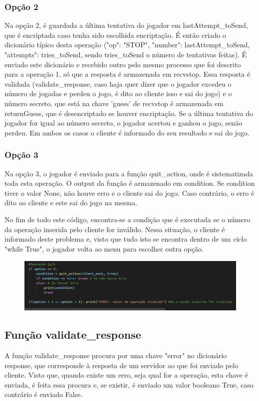 \documentclass{report}
\begin{document}
\subsubsection{Opção 2}
\label{sssec:second}

Na opção 2, é guardada a última tentativa do jogador em lastAttempt\_toSend, que é encriptada caso tenha sido escolhida encriptação.
É então criado o dicionário típico desta operação ({"op": "STOP", "number": lastAttempt\_toSend, "attempts": tries\_toSend}, sendo
tries\_toSend o número de tentativas feitas). É enviado este dicionário e recebido outro pelo mesmo processo que foi descrito para
a operação 1, só que a resposta é armazenada em recvstop. Essa resposta é validada (validate\_response, caso haja quer dizer que
o jogador excedeu o número de jogadas e perdeu o jogo, é dito ao cliente isso e sai do jogo)
e o número secreto, que está na chave 'guess' de recvstop é armazenada em returnGuess, que é desencriptado se houver encriptação.
Se a última tentativa do jogador for igual ao número secreto, o jogador acertou e ganhou o jogo, senão perdeu. Em ambos os casos
o cliente é informado do seu resultado e sai do jogo.

\subsubsection{Opção 3}
\label{sssec:third}
Na opção 3, o jogador é enviado para a função quit\_action, onde é sistematizada toda esta operação. O output da função
é armazenado em condition. Se condition tiver o valor None, não houve erro e o cliente sai do jogo. Caso contrário, o erro é
dito ao cliente e este sai do jogo na mesma.

No fim de todo este código, encontra-se a condição que é executada se o número da operação inserida pelo cliente for inválido. Nessa situação, o cliente é informado deste problema e, visto que tudo isto se encontra dentro de um ciclo "while True", o jogador volta ao menu para escolher outra opção.

\begin{figure}[!h]
\center
\includegraphics[height = 75pt]{img/option3.png}
\end{figure}
\subsection{Função validate\_response}
\label{ssec:validate}
A função validate\_response procura por uma chave "error" no dicionário response, que corresponde à resposta de um servidor
ao que foi enviado pelo cliente. Visto que, quando existe um erro, seja qual for a operação, esta chave é enviada, é feita essa
procura e, se existir, é enviado um valor booleano True, caso contrário é enviado False.
\end{document}
